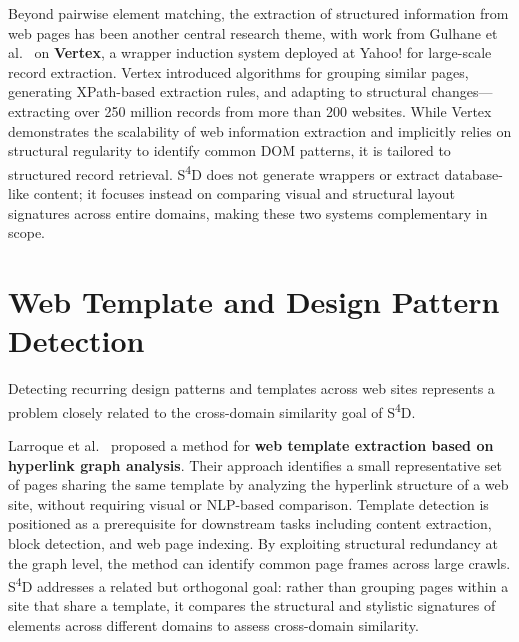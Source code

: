 Beyond pairwise element matching, the extraction of structured information from web pages has been another central research theme, with work from Gulhane et al.~\cite{gulhane2011vertex} on \textbf{Vertex}, a wrapper induction system deployed at Yahoo! for large-scale record extraction. Vertex introduced algorithms for grouping similar pages, generating XPath-based extraction rules, and adapting to structural changes---extracting over 250 million records from more than 200 websites. While Vertex demonstrates the scalability of web information extraction and implicitly relies on structural regularity to identify common DOM patterns, it is tailored to structured record retrieval. S\textsuperscript{4}D does not generate wrappers or extract database-like content; it focuses instead on comparing visual and structural layout signatures across entire domains, making these two systems complementary in scope.

\section{Web Template and Design Pattern Detection}
\label{sec:template-detection}

Detecting recurring design patterns and templates across web sites represents a problem closely related to the cross-domain similarity goal of S\textsuperscript{4}D.

Larroque et al.~\cite{larroque2014template} proposed a method for \textbf{web template extraction based on hyperlink graph analysis}. Their approach identifies a small representative set of pages sharing the same template by analyzing the hyperlink structure of a web site, without requiring visual or NLP-based comparison. Template detection is positioned as a prerequisite for downstream tasks including content extraction, block detection, and web page indexing. By exploiting structural redundancy at the graph level, the method can identify common page frames across large crawls. S\textsuperscript{4}D addresses a related but orthogonal goal: rather than grouping pages within a site that share a template, it compares the structural and stylistic signatures of elements across different domains to assess cross-domain similarity.

